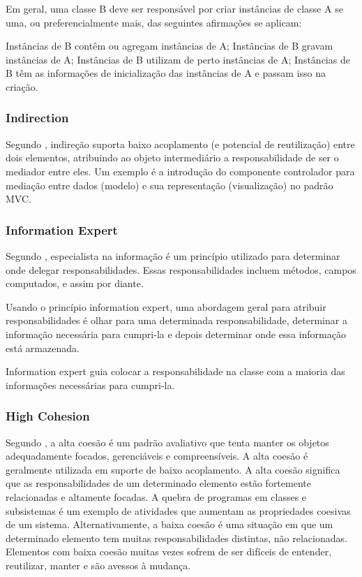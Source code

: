 \documentclass[12pt]{article}
\begin{document}
Em geral, uma classe B deve ser responsável por criar instâncias de classe A se uma, ou preferencialmente mais, das seguintes afirmações se aplicam:

Instâncias de B contêm ou agregam instâncias de A;
Instâncias de B gravam instâncias de A;
Instâncias de B utilizam de perto instâncias de A;
Instâncias de B têm as informações de inicialização das instâncias de A e passam isso na criação.

\subsubsection{Indirection} \label{sec:grasp}

Segundo \cite{CRAIG_LARMAN}, indireção suporta baixo acoplamento (e potencial de reutilização) entre dois elementos, atribuindo ao objeto intermediário a responsabilidade de ser o mediador entre eles. Um exemplo é a introdução do componente controlador para mediação entre dados (modelo) e sua representação (visualização) no padrão MVC.

\subsubsection{Information Expert} \label{sec:grasp}

Segundo \cite{CRAIG_LARMAN}, especialista na informação é um princípio utilizado para determinar onde delegar responsabilidades. Essas responsabilidades incluem métodos, campos computados, e assim por diante.

Usando o princípio information expert, uma abordagem geral para atribuir responsabilidades é olhar para uma determinada responsabilidade, determinar a informação necessária para cumpri-la e depois determinar onde essa informação está armazenada.

Information expert guia colocar a responsabilidade na classe com a maioria das informações necessárias para cumpri-la.

\subsubsection{High Cohesion} \label{sec:grasp}

Segundo \cite{CRAIG_LARMAN}, a alta coesão é um padrão avaliativo que tenta manter os objetos adequadamente focados, gerenciáveis e compreensíveis. A alta coesão é geralmente utilizada em suporte de baixo acoplamento. A alta coesão significa que as responsabilidades de um determinado elemento estão fortemente relacionadas e altamente focadas. A quebra de programas em classes e subsistemas é um exemplo de atividades que aumentam as propriedades coesivas de um sistema. Alternativamente, a baixa coesão é uma situação em que um determinado elemento tem muitas responsabilidades distintas, não relacionadas. Elementos com baixa coesão muitas vezes sofrem de ser difíceis de entender, reutilizar, manter e são avessos à mudança.
\end{document}
